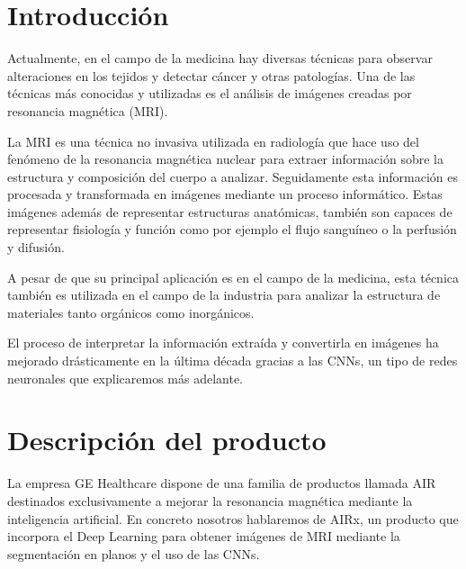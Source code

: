 
\null
\vspace{4em}

\section{Introducción}
Actualmente, en el campo de la medicina hay diversas técnicas para observar alteraciones en los tejidos y detectar cáncer y otras patologías. Una de las técnicas más conocidas y utilizadas es el análisis de imágenes creadas por resonancia magnética (MRI). 

La MRI es una técnica no invasiva utilizada en radiología que hace uso del fenómeno de la resonancia magnética nuclear para extraer información sobre la estructura y composición del cuerpo a analizar. Seguidamente esta información es procesada y transformada en imágenes mediante un proceso informático. Estas imágenes además de representar estructuras anatómicas, también son capaces de representar fisiología y función como por ejemplo el flujo sanguíneo o la perfusión y difusión.

A pesar de que su principal aplicación es en el campo de la medicina, esta técnica también es utilizada en el campo de la industria para analizar la estructura de materiales tanto orgánicos como inorgánicos.

El proceso de interpretar la información extraída y convertirla en imágenes ha mejorado drásticamente en la última década gracias a las CNNs, un tipo de redes neuronales que explicaremos más adelante.

\pagebreak
\section{Descripción del producto}
La empresa GE Healthcare dispone de una familia de productos llamada AIR destinados exclusivamente a mejorar la resonancia magnética mediante la inteligencia artificial. En concreto nosotros hablaremos de AIRx, un producto que incorpora el Deep Learning para obtener imágenes de MRI mediante la segmentación en planos y el uso de las CNNs.

